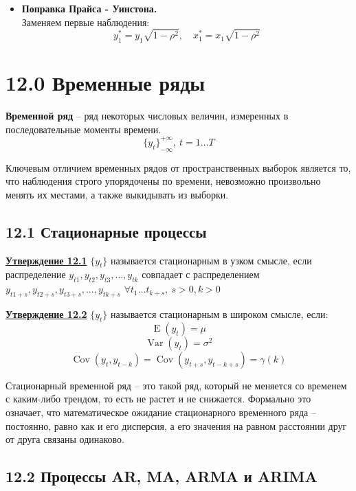 \documentclass[a0,final]{a0poster}
\DeclareMathOperator{\Var}{Var}
\DeclareMathOperator{\Cov}{Cov}
\DeclareMathOperator{\E}{E}
\begin{document}
\begin{multicols}{4}
\begin{itemize}
\item \textbf{Поправка Прайса - Уинстона.} \\
Заменяем первые наблюдения:\\
$$y^*_1 = y_1\sqrt{1-\rho^2}, \quad x^*_1 = x_1\sqrt{1-\rho^2}$$


\end{itemize}
\section*{12.0 Временные ряды}
\begin{tcolorbox}[colback=red!5!white,colframe=red!75!black]
\textbf{Временной ряд} -- ряд некоторых числовых величин, измеренных в последовательные моменты времени.
$${\{y_t\}}^{+\infty}_{-\infty},\:t=1\dotsc T$$
\end{tcolorbox}
Ключевым отличием временных рядов от пространственных выборок является то, что наблюдения строго упорядочены по времени, невозможно произвольно менять их местами, а также выкидывать из выборки.

\subsection*{\textbf{12.1 Стационарные процессы}}
\begin{tcolorbox}[colback=blue!5!white,colframe=blue!75!black]
\textbf{\underline{Утверждение 12.1}} \textbf{$\{y_t\}$} называется стационарным в узком смысле, если распределение $y_{t1},y_{t2},y_{t3},\dotsc,y_{tk}$ совпадает с распределением $y_{t1+s},y_{t2+s},y_{t3+s},\dotsc,y_{tk+s}$ \: $\forall t_1\dotsc t_{k+s},\:s>0, k>0$
\end{tcolorbox}

\begin{tcolorbox}[colback=blue!5!white,colframe=blue!75!black]
\textbf{\underline{Утверждение 12.2}} \textbf{$\{y_t\}$} называется стационарным в широком смысле, если:
$$\E(y_t)=\mu$$
$$\Var(y_t)=\sigma^2$$
$$\Cov(y_t,y_{t-k})=\Cov(y_{t+s},y_{t-k+s})=\gamma(k)$$
\end{tcolorbox}

Стационарный временной ряд -- это такой ряд, который не меняется со временем с каким-либо трендом, то есть не растет и не снижается. Формально это означает, что математическое ожидание стационарного временного ряда -- постоянно, равно как и его дисперсия, а его значения на равном расстоянии друг от друга связаны одинаково.

\subsection*{\textbf{12.2 Процессы AR, MA, ARMA и ARIMA}}


\end{multicols}
\end{document}
